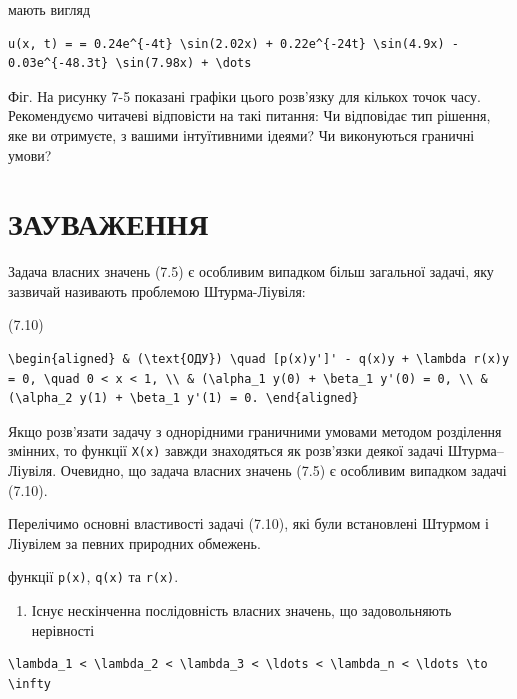 \documentclass[
  ukrainian,
]{article}
\providecommand{\tightlist}{%
  \setlength{\itemsep}{0pt}\setlength{\parskip}{0pt}}
\begin{document}
мають вигляд

\begin{verbatim}
u(x, t) = = 0.24e^{-4t} \sin(2.02x) + 0.22e^{-24t} \sin(4.9x) - 0.03e^{-48.3t} \sin(7.98x) + \dots
\end{verbatim}

Фіг. На рисунку 7-5 показані графіки цього розв'язку для кількох точок
часу. Рекомендуємо читачеві відповісти на такі питання: Чи відповідає
тип рішення, яке ви отримуєте, з вашими інтуїтивними ідеями? Чи
виконуються граничні умови?

\section{ЗАУВАЖЕННЯ}\label{ux437ux430ux443ux432ux430ux436ux435ux43dux43dux44f-4}

Задача власних значень (7.5) є особливим випадком більш загальної
задачі, яку зазвичай називають проблемою Штурма-Ліувіля:

(7.10)

\begin{verbatim}
\begin{aligned} & (\text{ОДУ}) \quad [p(x)y']' - q(x)y + \lambda r(x)y = 0, \quad 0 < x < 1, \\ & (\alpha_1 y(0) + \beta_1 y'(0) = 0, \\ & (\alpha_2 y(1) + \beta_1 y'(1) = 0. \end{aligned}
\end{verbatim}

Якщо розв'язати задачу з однорідними граничними умовами методом
розділення змінних, то функції \texttt{X(x)} завжди знаходяться як
розв'язки деякої задачі Штурма--Ліувіля. Очевидно, що задача власних
значень (7.5) є особливим випадком задачі (7.10).

Перелічимо основні властивості задачі (7.10), які були встановлені
Штурмом і Ліувілем за певних природних обмежень.

функції \texttt{p(x)}, \texttt{q(x)} та \texttt{r(x)}.

\begin{enumerate}
\def\labelenumi{\arabic{enumi}.}
\tightlist
\item
  Існує нескінченна послідовність власних значень, що задовольняють
  нерівності
\end{enumerate}

\begin{verbatim}
\lambda_1 < \lambda_2 < \lambda_3 < \ldots < \lambda_n < \ldots \to \infty
\end{verbatim}
\end{document}
